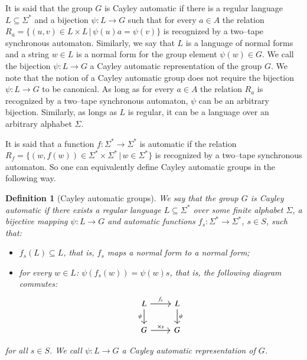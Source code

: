 \documentclass[article,12pt]{elsarticle}
\newtheorem{definition}{Definition}
\begin{document}
It is said that the group $G$ is Cayley automatic
if there is a regular language 
$L \subseteq \Sigma^*$ and a bijection 
$\psi: L \rightarrow G$ such that 
for every $a \in A$ the relation 
$R_a = 
\{ (u,v) \in L \times L \, | \, 
\psi(u) a = \psi (v)\}$
is recognized by a two--tape synchronous automaton.  
Similarly, we say that 
$L$ is a language of normal forms and 
a string $w \in L$ is a normal form for the group 
element $\psi (w) \in G$. We call the bijection 
$\psi : L \rightarrow G$ a Cayley automatic 
representation of the group $G$. 
We note that the notion of a Cayley automatic group does not 
require the bijection $\psi : L \rightarrow G$ 
to be canonical. As long as for every $a\in A$ 
the relation $R_a$ is recognized by
a two--tape synchronous automaton, $\psi$ can 
be an arbitrary bijection. Similarly, as longs 
as $L$ is regular, it can be a language over an 
arbitrary alphabet $\Sigma$.      


It is said that a function 
$f : \Sigma^* \rightarrow \Sigma^*$ 
is automatic if the relation 
$R_f = \{(w, f(w)) \in \Sigma^* \times \Sigma^* 
\, | \,  w \in \Sigma^* \}$ is recognized 
by a two--tape synchronous automaton.
So one can equivalently define Cayley 
automatic groups in the following way. 

	  
  
\begin{definition}[Cayley automatic groups]
	\label{Cayley_automatic_def}	
	We say that the group $G$ is Cayley automatic 
	if there exists a regular language 
	$L \subseteq \Sigma^*$  
	over some finite alphabet $\Sigma$,
	a bijective mapping $\psi : L \rightarrow G$ 
	and automatic functions 
	$f_s : \Sigma^* \rightarrow \Sigma^*$, $s \in S$,
	such that: 
	\begin{itemize} 
		\item{$f_s (L) \subseteq L$, that is,  
			$f_s$ maps a normal form to a normal form;}
		\item{for every $w \in L$: 
			$\psi (f_s (w)) = \psi (w) s$, that is,  
			the following diagram commutes:
			\[ \begin{tikzcd}
			L \arrow{r}{f_s} \arrow[swap]{d}{\psi} & 
			L \arrow{d}{\psi} \\%
			G \arrow{r}{\times s}& G
			\end{tikzcd}
			\]}  
	\end{itemize} 
	for all $s \in S$. We call 
	$\psi: L \rightarrow G$ a Cayley automatic representation 
	of $G$. 
\end{definition}	
\end{document}
